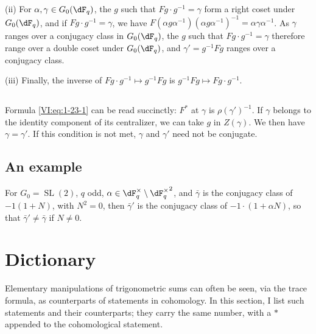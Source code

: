 \documentclass[oneside]{book}
\begin{document}
(ii) For $\alpha,\gamma\in G_0(\dF_q)$, the $g$ such that 
$F g\cdot g^{-1} = \gamma$ form a right coset under $G_0(\dF_q)$, and 
if $F g\cdot g^{-1} = \gamma$, we have 
$F(\alpha g \alpha^{-1})(\alpha g \alpha^{-1})^{-1} = \alpha \gamma\alpha^{-1}$. 
As $\gamma$ ranges over a conjugacy class in $G_0(\dF_q)$, the $g$ 
such that $F g\cdot g^{-1} = \gamma$ therefore range over a double coset under 
$G_0(\dF_q)$, and $\gamma'= g^{-1} F g$ ranges over a conjugacy class. 

(iii) Finally, the inverse of $F g\cdot g^{-1}\mapsto g^{-1} F g$ is 
$g^{-1} F g\mapsto F g\cdot g^{-1}$. 





\subsection{}\label{VI:1-25}

Formula \eqref{VI:eq:1-23-1} can be read succinctly: $F^\ast$ at 
$\gamma$ is $\rho(\gamma')^{-1}$. If $\gamma$ belongs to the identity component 
of its centralizer, we can take $g$ in $Z(\gamma)$. We then have 
$\gamma=\gamma'$. If this condition is not met, $\gamma$ and $\gamma'$ 
need not be conjugate. 





\subsection{An example}\label{VI:1-26}

For $G_0=\operatorname{SL}(2)$, $q$ odd, 
$\alpha\in \dF_q^\times\setminus {\dF_q^\times}^2$, and $\bar\gamma$ is the 
conjugacy class of $-1(1+N)$, with $N^2=0$, then $\bar\gamma'$ is the 
conjugacy class of $-1\cdot (1+\alpha N)$, so that $\bar\gamma'\ne \bar\gamma$ 
if $N\ne 0$. 










\section{Dictionary}\label{VI:2}

Elementary manipulations of trigonometric sums can often 
be seen, via the trace formula, as counterparts of statements 
in cohomology. In this section, I list such statements and their 
counterparts; they carry the same number, with a $\ast$ appended to 
the cohomological statement. 
\end{document}

